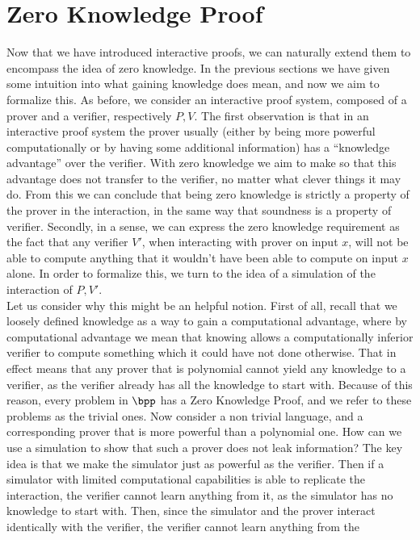 \documentclass{article}
\begin{document}
\section{Zero Knowledge Proof}
\label{zkp}
Now that we have introduced interactive proofs, we can naturally extend them to encompass the idea of zero knowledge.
In the previous sections we have given some intuition into what gaining knowledge does mean, and now we aim to
formalize this. As before, we consider an interactive proof system, composed of a prover and a verifier,
respectively $P, V$. The first observation is that in an interactive proof system the prover usually
(either by being more powerful computationally or by having some additional information) has
a \enquote{knowledge advantage} over the verifier.
With zero knowledge we aim to make so that this advantage does not transfer to the verifier,
no matter what clever things it may do. From this we can conclude that being zero knowledge is strictly a
property of the prover in the interaction, in the same way that soundness is a property of verifier.
Secondly, in a sense, we can express the zero knowledge requirement as the fact that any verifier $V'$,
when interacting with prover on input $x$, will not be able to compute anything that it wouldn't have been able
to compute on input $x$ alone. In order to formalize this, we turn to the idea of a simulation of
the interaction of $P, V'$. \\
Let us consider why this might be an helpful notion. First of all, recall that we loosely defined knowledge as a
way to gain a computational advantage, where by computational advantage we mean that knowing allows a computationally
inferior verifier to compute something which it could have not done otherwise. That in effect means that any prover that
is polynomial cannot yield any knowledge to a verifier, as the verifier already has all the knowledge to start with.
Because of this reason, every problem in $\bpp$ has a Zero Knowledge Proof, and we refer to these problems as the trivial ones.
Now consider a non trivial language, and a corresponding prover that is more powerful than a polynomial one. How can
we use a simulation to show that such a prover does not leak information? The key idea is that we make the simulator
just as powerful as the verifier. Then if a simulator with limited computational capabilities is able to replicate
the interaction, the verifier cannot learn anything from it, as the simulator has no knowledge to start with. Then,
since the simulator and the prover interact identically with the verifier, the verifier cannot learn anything from the
\end{document}
